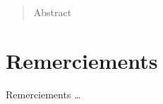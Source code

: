 \frontmatter

\begin{abstract}
Abstract
\end{abstract}

\clearpage
\section*{Remerciements}
Remerciements \dots
